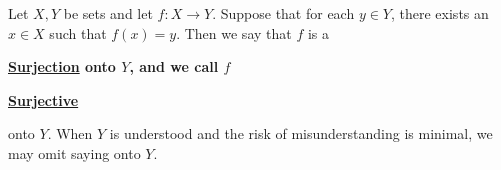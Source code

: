 \newcommand{\Surjective}[0]{
    \bf \hyperref[def:Surjective]{Surjective} \rm
}
\newcommand{\Surjectivity}[0]{
    \bf \hyperref[def:Surjective]{Surjectivity} \rm
}
\newcommand{\Surjection}[0]{
    \bf \hyperref[def:Surjective]{Surjection} \rm
}
\newcommand{\Surjections}[0]{
    \bf \hyperref[def:Surjective]{Surjections} \rm
}\begin{df}[Surjective]
\label{def:Surjective}

\rm
   Let $X,Y$ be sets and let 
   $f:X \to Y$. 
   Suppose that 
   for each $y \in Y$, 
   there exists an 
   $x \in X$ such that 
   $f(x) = y$. 
   Then we say that $f$ 
   is a
   \Surjection onto $Y$, 
   and we call $f$ 
   \Surjective
   onto $Y$. 
   When $Y$ is understood and the risk of 
   misunderstanding is minimal, 
   we may omit saying onto $Y$.
\end{df}
